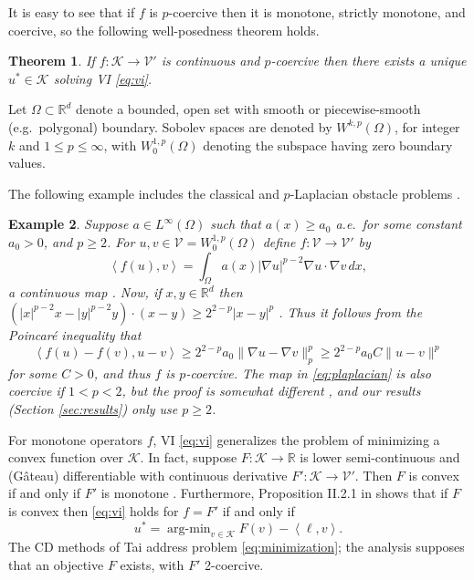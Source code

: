\documentclass[letterpaper,final,12pt,reqno]{amsart}
\theoremstyle{cstyle}
\newtheorem{theorem}{Theorem}
\theoremstyle{cstyle*}
\theoremstyle{dstyle}
\newtheorem{example}[theorem]{Example}
\numberwithin{equation}{section}
\numberwithin{figure}{section}
\numberwithin{table}{section}
\numberwithin{theorem}{section}
\newcommand{\RR}{\mathbb{R}}
\newcommand{\grad}{\nabla}
\newcommand{\cK}{\mathcal{K}}
\newcommand{\cV}{\mathcal{V}}
\newcommand{\ip}[2]{\left<#1,#2\right>}
\begin{document}
It is easy to see that if $f$ is $p$-coercive then it is monotone, strictly monotone, and coercive, so the following well-posedness theorem holds.

\begin{theorem}  \label{thm:viwellposed}  If $f:\cK \to \cV'$ is continuous and $p$-coercive then there exists a unique $u^*\in \cK$ solving VI \eqref{eq:vi}.
\end{theorem}

Let $\Omega \subset \RR^d$ denote a bounded, open set with smooth or piecewise-smooth (e.g.~polygonal) boundary.  Sobolev spaces \cite{Evans2010} are denoted by $W^{k,p}(\Omega)$, for integer $k$ and $1\le p \le \infty$, with $W^{1,p}_0(\Omega)$ denoting the subspace having zero boundary values.

The following example includes the classical and $p$-Laplacian obstacle problems \cite{ChoeLewis1991}.

\begin{example}  \label{ex:plaplacian}  Suppose $a\in L^\infty(\Omega)$ such that $a(x)\ge a_0$ a.e.~for some constant $a_0>0$, and $p\ge 2$.  For $u,v \in \cV = W^{1,p}_0(\Omega)$ define $f:\cV \to \cV'$ by
\begin{equation}
\ip{f(u)}{v} = \int_\Omega a(x) |\grad u|^{p-2} \grad u \cdot \grad v\,dx, \label{eq:plaplacian}
\end{equation}
a continuous map \cite[Theorem A.0.6]{Peral1997}.  Now, if $x,y\in\RR^d$ then $(|x|^{p-2} x - |y|^{p-2} y)\cdot (x-y) \ge 2^{2-p} |x-y|^p$ \cite[see Appendix A and references therein]{Bueler2021conservation}.  Thus it follows from the Poincar\'e inequality that
    $$\ip{f(u) - f(v)}{u-v} \ge 2^{2-p} a_0 \|\grad u - \grad v\|_p^p \ge 2^{2-p} a_0 C \|u-v\|^p$$
for some $C>0$, and thus $f$ is $p$-coercive.  The map in \eqref{eq:plaplacian} is also coercive if $1<p<2$, but the proof is somewhat different \cite[Theorem 4.4]{Bueler2021conservation}, and our results (Section \ref{sec:results}) only use $p\ge 2$.  \end{example}

For monotone operators $f$, VI \eqref{eq:vi} generalizes the problem of minimizing a convex function over $\cK$.  In fact, suppose $F:\cK \to \RR$ is lower semi-continuous and (G\^ateau) differentiable with continuous derivative $F':\cK \to \cV'$.  Then $F$ is convex if and only if $F'$ is monotone \cite[Proposition I.5.5]{EkelandTemam1976}.  Furthermore, Proposition II.2.1 in \cite{EkelandTemam1976} shows that if $F$ is convex then \eqref{eq:vi} holds for $f=F'$ if and only if
\begin{equation}
u^* = \operatorname{arg-min}_{v\in\cK} F(v) - \ip{\ell}{v}. \label{eq:minimization}
\end{equation}
The CD methods of Tai \cite{Tai2003} address problem \eqref{eq:minimization}; the analysis supposes that an objective $F$ exists, with $F'$ 2-coercive.
\end{document}
